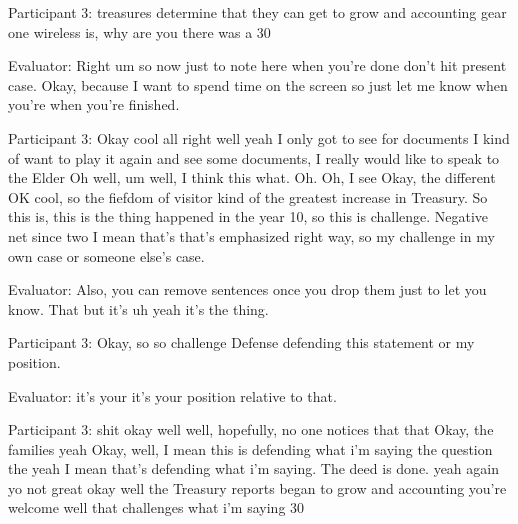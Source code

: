 \documentclass{l4proj}
\begin{document}
\begin{appendices}
Participant 3: treasures determine that they can get to grow and accounting gear one wireless is, why are you there was a 30%

Evaluator: Right um so now just to note here when you're done don't hit present case. Okay, because I want to spend time on the screen so just let me know when you're when you're finished.

Participant 3: Okay cool all right well yeah I only got to see for documents I kind of want to play it again and see some documents, I really would like to speak to the Elder Oh well, um well, I think this what. Oh. Oh, I see Okay, the different OK cool, so the fiefdom of visitor kind of the greatest increase in Treasury. So this is, this is the thing happened in the year 10, so this is challenge. Negative net since two I mean that's that's emphasized right way, so my challenge in my own case or someone else's case.

Evaluator: Also, you can remove sentences once you drop them just to let you know. That but it's uh yeah it's the thing.

Participant 3: Okay, so so challenge Defense defending this statement or my position.

Evaluator: it's your it's your position relative to that.

Participant 3: shit okay well well, hopefully, no one notices that that Okay, the families yeah Okay, well, I mean this is defending what i'm saying the question the yeah I mean that's defending what i'm saying. The deed is done. yeah again yo not great okay well the Treasury reports began to grow and accounting you're welcome well that challenges what i'm saying 30%


\end{appendices}
\end{document}
